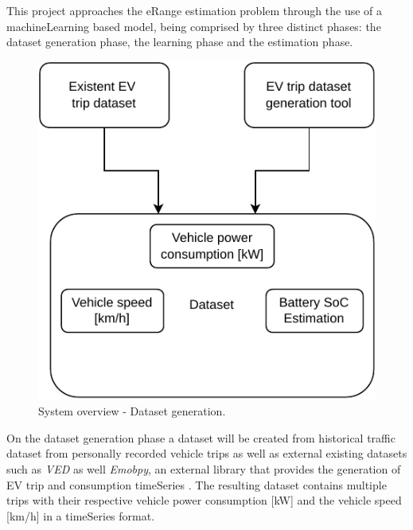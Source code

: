 This project approaches the \gls{eRange} estimation
problem through the use of a \gls{machineLearning}
based model, being comprised by three distinct phases: 
the \gls{dataset} generation phase, the learning phase
and the estimation phase.

\begin{figure}[H]
    \begin{center}
        \includegraphics[scale=1.0]{../figures/generic_diagram_dataset_generation_phase}
        \caption{System overview - Dataset generation.}
        \label{fig:generic_diagram_dataset_generation_phase}
    \end{center}
\end{figure}

On the \gls{dataset} generation phase
a \gls{dataset} will be created from historical traffic dataset
from personally recorded vehicle trips as well as
external existing datasets such as \textit{VED} 
\citep{vedDataset} as well \textit{Emobpy}, an external 
library that provides the generation of \gls{EV} 
trip and consumption \gls{timeSeries} \citep{emobpy}.
The resulting dataset contains multiple
trips with their respective vehicle power consumption [kW]
and the vehicle speed [km/h] in a  \gls{timeSeries} format.

